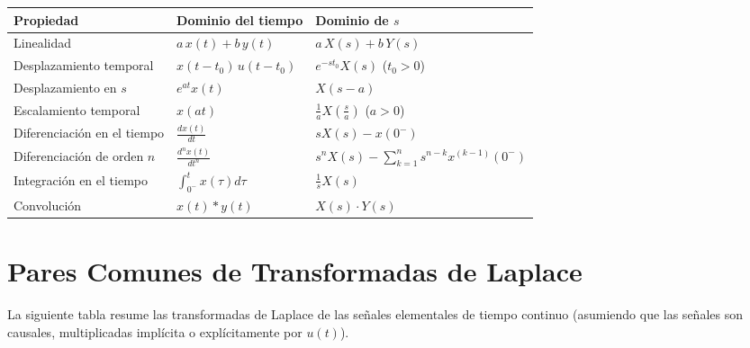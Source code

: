 \renewcommand{\arraystretch}{1.8} %
\begin{center}
	\begin{tabular}{p{4.5cm} p{4cm} p{4.5cm}}
		\hline
		\textbf{Propiedad} & \textbf{Dominio del tiempo} & \textbf{Dominio de $s$} \\
		\hline
		Linealidad & $a \, x(t) + b \, y(t)$ & $a \, X(s) + b \, Y(s)$ \\
		Desplazamiento temporal & $x(t-t_0) \, u(t-t_0)$ & $e^{-st_0} X(s)$ \quad ($t_0 > 0$) \\
		Desplazamiento en $s$ & $e^{at} x(t)$ & $X(s-a)$ \\
		Escalamiento temporal & $x(at)$ & $\frac{1}{a} X\left(\frac{s}{a}\right)$ \quad ($a > 0$) \\
		Diferenciación en el tiempo & $\frac{dx(t)}{dt}$ & $s X(s) - x(0^{-})$ \\
		Diferenciación de orden $n$ & $\frac{d^n x(t)}{dt^n}$ & $s^n X(s) - \sum_{k=1}^{n} s^{n-k} x^{(k-1)}(0^{-})$ \\
		Integración en el tiempo & $\int_{0^{-}}^{t} x(\tau) d\tau$ & $\frac{1}{s} X(s)$ \\
		Convolución & $x(t) * y(t)$ & $X(s) \cdot Y(s)$ \\
		\hline
	\end{tabular}
\end{center}

\section{Pares Comunes de Transformadas de Laplace}

La siguiente tabla resume las transformadas de Laplace de las señales elementales de tiempo continuo (asumiendo que las señales son causales, multiplicadas implícita o explícitamente por $u(t)$).

